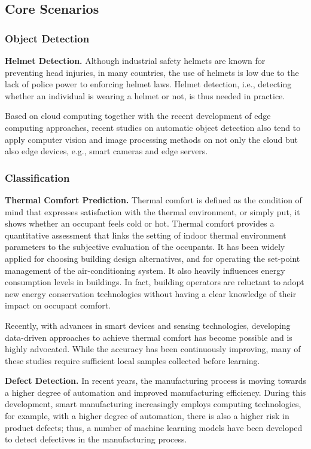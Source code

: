 \subsection{Core Scenarios}

\subsubsection{Object Detection}
\textbf{Helmet Detection.} Although industrial safety helmets are known for preventing head injuries, in many countries, the use of helmets is low due to the lack of police power to enforcing helmet laws. Helmet detection, i.e., detecting whether an individual is wearing a helmet or not, is thus needed in practice. 

Based on cloud computing together with the recent development of edge computing approaches, recent studies on automatic object detection also tend to apply computer vision and image processing methods on not only the cloud but also edge devices, e.g., smart cameras and edge servers. 


\subsubsection{Classification}
\textbf{Thermal Comfort Prediction.} Thermal comfort is defined as the condition of mind that expresses satisfaction with the thermal environment, or simply put, it shows whether an occupant feels cold or hot. Thermal comfort provides a quantitative assessment that links the setting of indoor thermal environment parameters to the subjective evaluation of the occupants. It has been widely applied for choosing building design alternatives, and for operating the set-point management of the air-conditioning system. It also heavily influences energy consumption levels in buildings. In fact, building operators are reluctant to adopt new energy conservation technologies without having a clear knowledge of their impact on occupant comfort.

Recently, with advances in smart devices and sensing technologies, developing data-driven approaches to achieve thermal comfort has become possible and is highly advocated. While the accuracy has been continuously improving, many of these studies require sufficient local samples collected before learning.

\vspace{0.2cm} \noindent
\textbf{Defect Detection.} In recent years, the manufacturing process is moving towards a higher degree of automation and improved manufacturing efficiency. During this development, smart manufacturing increasingly employs computing technologies, for example, with a higher degree of automation, there is also a higher risk in product defects; thus, a number of machine learning models have been developed to detect defectives in the manufacturing process.  

